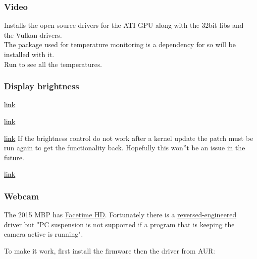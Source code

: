 \subsubsection{Video}
\begin{blocksection}
	Installs the open source drivers for the ATI GPU along with the 32bit libs and the Vulkan drivers.\\
	The \href{https://wiki.archlinux.org/index.php/Lm_sensors}{} package used for temperature monitoring is a dependency for  so will be installed with it.\\
	Run  to see all the temperatures.
\end{blocksection}

\subsubsection{Display brightness}

\href{https://github.com/0xbb/apple_set_os.efi}{link}

\href{https://github.com/Dunedan/mbp-2016-linux/issues/38}{link}


\href{https://bugzilla.kernel.org/show_bug.cgi?id=105051#c37}{link}
If the brightness control do not work after a kernel update the patch must be run again to get the functionality back. Hopefully this won''t be an issue in the future.


\href{https://bugzilla.kernel.org/show_bug.cgi?id=105051#c39}{link}

\subsubsection{Webcam}

The 2015 MBP has \href{https://wiki.archlinux.org/index.php/MacBook#Facetime_HD}{Facetime HD}.
Fortunately there is a \href{https://github.com/patjak/bcwc_pcie}{reversed-engineered driver} but "PC suspension is not supported if a 
program that is keeping the camera active is running".

To make it work, first install the firmware then the driver from AUR:


